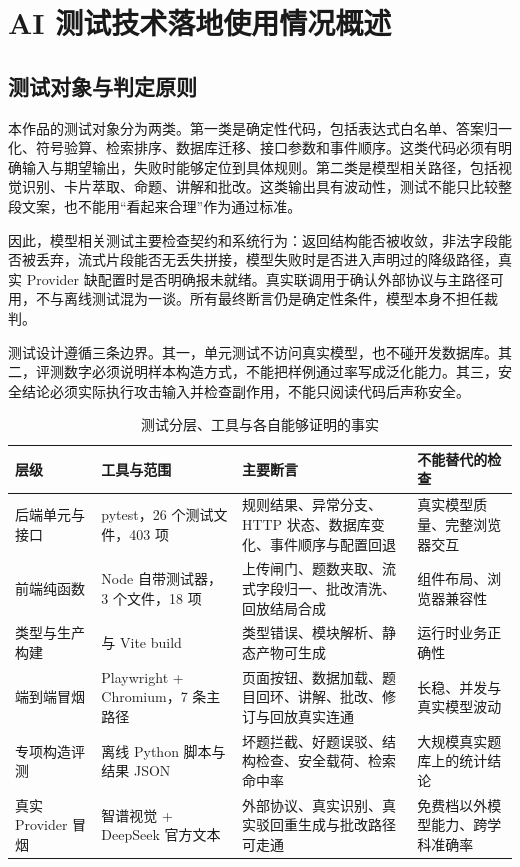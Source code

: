\section{AI 测试技术落地使用情况概述}

\subsection{测试对象与判定原则}

本作品的测试对象分为两类。第一类是确定性代码，包括表达式白名单、答案归一化、符号验算、检索排序、数据库迁移、接口参数和事件顺序。这类代码必须有明确输入与期望输出，失败时能够定位到具体规则。第二类是模型相关路径，包括视觉识别、卡片萃取、命题、讲解和批改。这类输出具有波动性，测试不能只比较整段文案，也不能用“看起来合理”作为通过标准。

因此，模型相关测试主要检查契约和系统行为：返回结构能否被收敛，非法字段能否被丢弃，流式片段能否无丢失拼接，模型失败时是否进入声明过的降级路径，真实 Provider 缺配置时是否明确报未就绪。真实联调用于确认外部协议与主路径可用，不与离线测试混为一谈。所有最终断言仍是确定性条件，模型本身不担任裁判。

测试设计遵循三条边界。其一，单元测试不访问真实模型，也不碰开发数据库。其二，评测数字必须说明样本构造方式，不能把样例通过率写成泛化能力。其三，安全结论必须实际执行攻击输入并检查副作用，不能只阅读代码后声称安全。

\begin{table}[H]
\centering\footnotesize
\caption{测试分层、工具与各自能够证明的事实}
\begin{tabularx}{\textwidth}{@{}L{2.4cm}L{3.0cm}Y L{3.5cm}@{}}
\toprule
\textbf{层级} & \textbf{工具与范围} & \textbf{主要断言} & \textbf{不能替代的检查} \\
\midrule
后端单元与接口 & pytest，26 个测试文件，403 项 & 规则结果、异常分支、HTTP 状态、数据库变化、事件顺序与配置回退 & 真实模型质量、完整浏览器交互 \\
前端纯函数 & Node 自带测试器，3 个文件，18 项 & 上传闸门、题数夹取、流式字段归一、批改清洗、回放结局合成 & 组件布局、浏览器兼容性 \\
类型与生产构建 &  与 Vite build & 类型错误、模块解析、静态产物可生成 & 运行时业务正确性 \\
端到端冒烟 & Playwright + Chromium，7 条主路径 & 页面按钮、数据加载、题目回环、讲解、批改、修订与回放真实连通 & 长稳、并发与真实模型波动 \\
专项构造评测 & 离线 Python 脚本与结果 JSON & 坏题拦截、好题误驳、结构检查、安全载荷、检索命中率 & 大规模真实题库上的统计结论 \\
真实 Provider 冒烟 & 智谱视觉 + DeepSeek 官方文本 & 外部协议、真实识别、真实驳回重生成与批改路径可走通 & 免费档以外模型能力、跨学科准确率 \\
\bottomrule
\end{tabularx}
\end{table}

